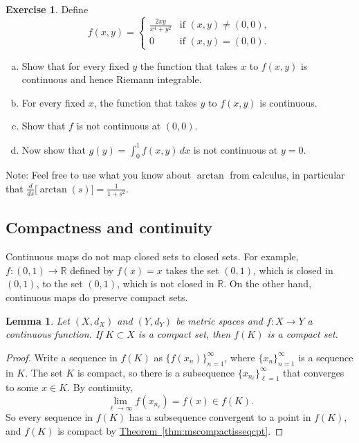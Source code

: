 \documentclass[12pt,openany]{book}
\newcommand{\R}{{\mathbb{R}}}
\theoremstyle{plain}
\newtheorem{lemma}[thm]{Lemma}
\theoremstyle{remark}
\theoremstyle{definition}
\newenvironment{exbox}{%
    \def\FrameCommand{\vrule width 1pt \relax\hspace{10pt}}%
    \MakeFramed{\advance\hsize-\width\FrameRestore}%
}{%
    \endMakeFramed
}
\newenvironment{exparts}{%
    \leavevmode\begin{enumerate}[a),noitemsep,topsep=0pt,parsep=0pt,partopsep=0pt]
}{%
    \end{enumerate}
}
\theoremstyle{exercise}
\newtheorem{exercise}{Exercise}[section]
\theoremstyle{example}
\newcommand{\thmref}[1]{\hyperref[#1]{Theorem~\ref*{#1}}}
\begin{document}
\begin{exbox}
\begin{exercise}
Define
\begin{equation*}
f(x,y) =
\begin{cases}
\frac{2xy}{x^4+y^2} & \text{if } (x,y) \not= (0,0), \\
0 & \text{if } (x,y) = (0,0) .
\end{cases}
\end{equation*}
\begin{exparts}
\item
Show that for every fixed $y$ the function that takes $x$ to $f(x,y)$
is continuous and hence Riemann integrable.
\item
For every fixed $x$, the function that takes $y$ to $f(x,y)$ is continuous.
\item
Show that $f$ is not continuous at $(0,0)$.
\item
Now show that $g(y) = \int_0^1 f(x,y)\,dx$ is not continuous at $y=0$.
\end{exparts}
Note: Feel free to use what you know about $\arctan$ from calculus,
in particular that $\frac{d}{ds} \bigl[ \arctan(s) \bigr] = \frac{1}{1+s^2}$.
\end{exercise}
\end{exbox}


\subsection{Compactness and continuity}

Continuous maps do not map closed sets to closed sets.  For example,
$f \colon (0,1) \to \R$ defined by $f(x) = x$ takes the set $(0,1)$, which
is closed in $(0,1)$, to the set $(0,1)$, which is not closed in $\R$.
On the other hand, continuous maps do preserve compact sets.

\begin{lemma} \label{lemma:continuouscompact}
Let $(X,d_X)$ and $(Y,d_Y)$ be metric spaces
and $f \colon X \to Y$ a continuous function.  If
$K \subset X$ is a compact set, then $f(K)$ is a compact set.
\end{lemma}

\begin{proof}
Write
a sequence in $f(K)$ as
$\bigl\{ f(x_n) \bigr\}_{n=1}^\infty$, where
$\{ x_n \}_{n=1}^\infty$ is a sequence in $K$.  The set $K$ is compact, so
there is a subsequence
$\{ x_{n_\ell} \}_{\ell=1}^\infty$ that converges to some $x \in K$.
By continuity,
\begin{equation*}
\lim_{\ell\to\infty} f(x_{n_\ell}) = f(x) \in f(K) .
\end{equation*}
So every sequence in $f(K)$ has a subsequence convergent to 
a point in $f(K)$, and $f(K)$ is compact by \thmref{thm:mscompactisseqcpt}.
\end{proof}
\end{document}

